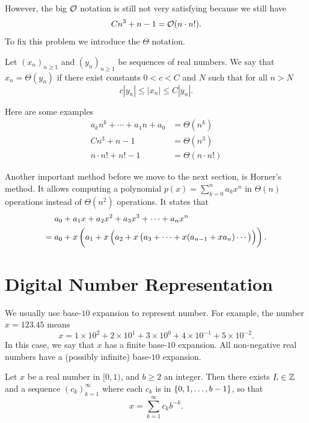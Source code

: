 \documentclass[11pt,a4paper]{article}
\begin{document}
However, the big $\mathcal{O}$ notation is still not very satisfying because
we still have
\[
  C n^3 + n - 1 = \mathcal{O}(n \cdot n!).
\]
To fix this problem we introduce the $\Theta$ notation.

\begin{definition}
  Let $(x_n)_{n \geq 1}$ and $(y_n)_{n \geq 1}$ be sequences of real numbers.
  We say that $x_n = \Theta(y_n)$ if there exist constants $0 < c < C$ and $N$ 
  such that for all $n > N$
  \[
    c |y_n| \le |x_n| \le C |y_n|.
  \]
\end{definition}

Here are some examples
\begin{align*}
  a_k n^k + \cdots + a_1 n + a_0 &= \Theta(n^k) \\
  Cn^3 + n - 1 &= \Theta(n^3) \\
  n \cdot n! + n! - 1 &= \Theta(n \cdot n!)
\end{align*}

\begin{example}
  Another important method before we move to the next section,
  is Horner's method.
  It allows computing a polynomial $p(x) = \sum_{k=0}^{n} a_k x^n$ in
  $\Theta(n)$ operations instead of $\Theta(n^2)$ operations.
  It states that
  \[
    \begin{aligned}
      &a_{0} + a_{1}x + a_{2}x^{2} + a_{3}x^{3} + \cdots + a_{n}x^{n} \\ = {}
      &a_{0} + x\del{a_{1} + x\del{a_{2} + x\del{a_{3} + \cdots + 
      x(a_{n-1} + x a_{n}) \cdots}}}.
    \end{aligned}
  \]
\end{example}

\section{Digital Number Representation}
We usually use base-$10$ expansion to represent number.
For example, the number $x = 123.45$ means
\[
  x = 1 \times 10^2 + 2 \times 10^1 + 3 \times 10^0 + 4 \times 10^{-1} +
    5 \times 10^{-2}.
\]
In this case, we say that $x$ has a finite base-$10$ expansion.
All non-negative real numbers have a (possibly infinite) base-$10$ expansion.

\begin{theorem}
  \label{thm:bases}
  Let $x$ be a real number in $[0,1)$, and $b \geq 2$ an integer.
  Then there exists $L \in \mathbb{Z}$ and a sequence $(c_k)_{k=1}^{\infty}$ where
  each $c_k$ is in $\left\{0,1,\dots,b-1\right\}$, so that
  \[
    x = \sum_{k=1}^{\infty} c_k b^{-k}.
  \]
\end{theorem}
\end{document}
